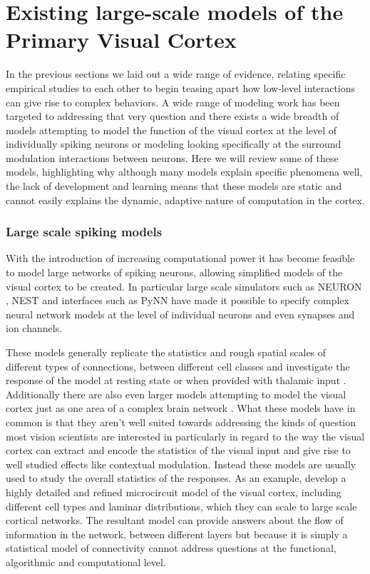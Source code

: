 \section{Existing large-scale models of the Primary Visual Cortex}

In the previous sections we laid out a wide range of evidence,
relating specific empirical studies to each other to begin teasing
apart how low-level interactions can give rise to complex behaviors. A
wide range of modeling work has been targeted to addressing that very
question and there exists a wide breadth of models attempting to model
the function of the visual cortex at the level of individually spiking
neurons or modeling looking specifically at the surround modulation
interactions between neurons. Here we will review some of these
models, highlighting why although many models explain specific
phenomena well, the lack of development and learning means that these
models are static and cannot easily explains the dynamic, adaptive
nature of computation in the cortex.

\subsubsection{Large scale spiking models} \label{LargeModels}

With the introduction of increasing computational power it has become
feasible to model large networks of spiking neurons, allowing
simplified models of the visual cortex to be created. In particular
large scale simulators such as NEURON \citep{Hines1994}, NEST
\citep{Gewaltig2007} and interfaces such as PyNN \citep{Davison2009}
have made it possible to specify complex neural network models at the
level of individual neurons and even synapses and ion channels.

These models generally replicate the statistics and rough spatial
scales of different types of connections, between different cell
classes and investigate the response of the model at resting state or
when provided with thalamic input \citep{Shelley2002,
  Potjans2014}. Additionally there are also even larger models
attempting to model the visual cortex just as one area of a complex
brain network \citep{Eliasmith2012}. What these models have in common
is that they aren't well suited towards addressing the kinds of
question most vision scientists are interested in particularly in
regard to the way the visual cortex can extract and encode the
statistics of the visual input and give rise to well studied effects
like contextual modulation. Instead these models are usually used to
study the overall statistics of the responses. As an example,
\cite{Potjans2014} develop a highly detailed and refined microcircuit
model of the visual cortex, including different cell types and laminar
distributions, which they can scale to large scale cortical
networks. The resultant model can provide answers about the flow of
information in the network, between different layers but because it is
simply a statistical model of connectivity cannot address questions at
the functional, algorithmic and computational level.

